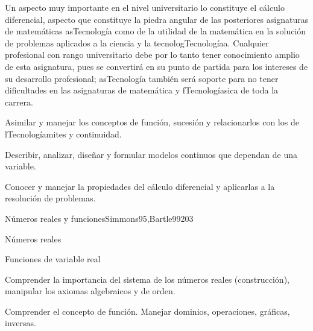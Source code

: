 \begin{syllabus}


\begin{justification}
Un aspecto muy importante en el nivel universitario lo constituye el cálculo diferencial,  aspecto que constituye la piedra angular de las posteriores asignaturas de matemáticas asTecnología como de la utilidad de la matemática en la solución de problemas aplicados a la ciencia y la tecnologTecnologíaa. Cualquier profesional con rango universitario debe por lo tanto tener conocimiento amplio de esta asignatura, pues se convertirá en su punto de partida para los intereses de su desarrollo profesional; asTecnología también será soporte para no tener dificultades en las asignaturas de matemática y fTecnologíasica de toda la carrera.
\end{justification}

\begin{goals}
\item Asimilar y manejar los conceptos de función, sucesión y relacionarlos con los de lTecnologíamites y continuidad.
\item Describir, analizar, diseñar y formular modelos continuos que dependan de una variable.
\item Conocer y manejar la propiedades del cálculo diferencial y aplicarlas a la resolución de problemas.
\end{goals}

\begin{outcomes}
\end{outcomes}

\begin{unit}{Números reales y funciones}{Simmons95,Bartle99}{20}{3}
   \begin{topics}
      \item Números reales
      \item Funciones de variable real
   \end{topics}

   \begin{unitgoals}
      \item Comprender la importancia del sistema de los números reales (construcción), manipular los axiomas algebraicos y de orden.
      \item Comprender el concepto de función. Manejar dominios, operaciones, gráficas, inversas.
      \end{unitgoals}
\end{unit}


\end{syllabus}
